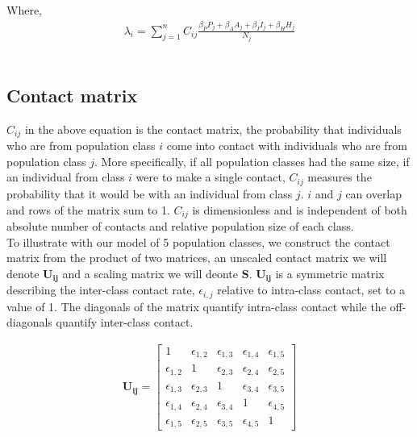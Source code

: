 \documentclass{article}
\begin{document}
Where, 
\\
\begin{gather*}
   \lambda_i = \sum_{j = 1}^n C_{ij} \frac{\beta_P P_j + \beta_A A_j + \beta_I I_j + \beta_H H_j}{N_j}
\end{gather*}
\\

\subsection*{Contact matrix}

$C_{ij}$ in the above equation is the contact matrix, the probability that individuals who are from population class $i$ come into contact with individuals who are from population class $j$. More specifically, if all population classes had the same size, if an individual from class $i$ were to make a single contact, $C_{ij}$ measures the probability that it would be with an individual from class $j$. $i$ and $j$ can overlap and rows of the matrix sum to 1. $C_{ij}$  is dimensionless and is independent of both  absolute number of contacts and relative population size of each class. \\

To illustrate with our model of 5 population classes, we construct the contact matrix from the product of two matrices, an unscaled contact matrix we will denote $\boldsymbol{U_{ij}}$ and a scaling matrix we will deonte $\boldsymbol{S}$. $\boldsymbol{U_{ij}}$ is a symmetric matrix describing the inter-class contact rate, $\epsilon_{i,j}$ relative to intra-class contact, set to a value of 1. The diagonals of the matrix quantify intra-class contact while the off-diagonals quantify inter-class contact.

\begin{gather}
   \boldsymbol{U_{ij}} = 
   \begin{bmatrix}
1 & \epsilon_{1,2} & \epsilon_{1,3} & \epsilon_{1,4} & \epsilon_{1,5} \\
\epsilon_{1,2} & 1 & \epsilon_{2,3} & \epsilon_{2,4} & \epsilon_{2,5} \\
\epsilon_{1,3} & \epsilon_{2,3} & 1 & \epsilon_{3,4} & \epsilon_{3,5} \\
\epsilon_{1,4} & \epsilon_{2,4} & \epsilon_{3,4} & 1 & \epsilon_{4,5} \\
\epsilon_{1,5} & \epsilon_{2,5} & \epsilon_{3,5} & \epsilon_{4,5} & 1 
\end{bmatrix}
\end{gather}
\end{document}
